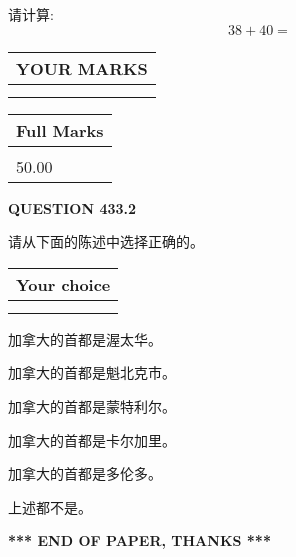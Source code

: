\documentclass{ctexart}
\begin{document}
  
 
请计算:
\begin{equation}
38 +  %
40 = \nonumber
\end{equation}
 

 

 
  
\vspace{0.2in}
  
\noindent\begin{tabular}{|l|}
\hline
 YOUR MARKS  \\
\hline
 \\ 
 \\ 
\hline
\end{tabular}
\hspace{0.05in} \begin{tabular}{|l|}
\hline
 Full Marks  \\
\hline
 \\ 
50.00 \\
\hline
\end{tabular}
{\textbf{\Large{QUESTION
433.2 
}}}
  
  
请从下面的陈述中选择正确的。
  
  
\noindent\hspace{3.0in} \begin{tabular}{|l|}
\hline
Your choice \\
\hline
 \\ 
 \\ 
\hline
\end{tabular}
  
  
 
 
加拿大的首都是渥太华。
 
 
加拿大的首都是魁北克市。
 
 
加拿大的首都是蒙特利尔。
 
 
加拿大的首都是卡尔加里。
 
 
加拿大的首都是多伦多。
 
 
 上述都不是。
 
 
   
   
 \vspace{0.2in}
 
   
   
   
   
\vspace{1.0in} 
{\textbf{\large{ *** END OF PAPER, THANKS *** }}} 
   
\end{document}
